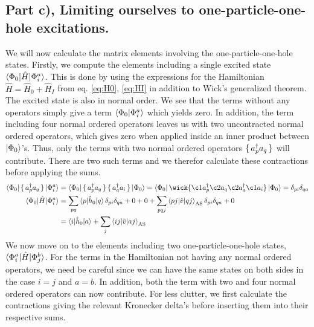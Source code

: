 \documentclass{article}
\newcommand{\gs}{\ket{\Phi_0}}
\newcommand{\inner}[3]{\braket{#1|#2|#3}}
\newcommand{\innerAS}[3]{\inner{#1}{#2}{#3}_{\text{AS}}}
\newcommand{\hnull}{\hat{h}_0}
\newcommand{\crt}[1]{a_{#1}^{\dagger}}
\newcommand{\ani}[1]{a_{#1}}
\begin{document}
\subsection*{Part c), Limiting ourselves to one-particle-one-hole excitations.}
    We will now calculate the matrix elements involving the one-particle-one-hole states. Firstly, we compute the elements including a single excited state $\inner{\Phi_0}{\hat{H}}{\Phi_i^a}$. This is done by using the expressions for the Hamiltonian $\hat{H} = \hat{H}_0 + \hat{H}_I$ from eq. \ref{eq:H0}, \ref{eq:HI} in addition to Wick's generalized theorem. The excited state is also in normal order. We see that the terms without any operators simply give a term $\braket{\Phi_0 | \Phi_{i}^{a}}$ which yields zero. In addition, the term including four normal ordered operators leaves us with two uncontracted normal ordered operators, which gives zero when applied inside an inner product between  $\gs$'s. Thus, only the terms with two normal ordered operators $\set{\crt{p}\ani{q}}$ will contribute. There are two such terms and we therefor calculate these contractions before applying the sums.  
    \begin{align}
        \inner{\Phi_0}{\set{\crt{p}\ani{q}}}{\Phi_{i}^{a}} &= \inner{\Phi_0}{\set{\crt{p}\ani{q}} \set{\crt{a}\ani{i}}}{\Phi_0} = \bra{\Phi_0} \wick{\c1{a}^\dagger_p \c2{a}_q \c2{a}^\dagger_a \c1{\ani{i}}} \ket{\Phi_0} = \delta_{pi}\delta_{qa} \nonumber\\
        \inner{\Phi_0}{\hat{H}}{\Phi_i^a} &= \sum_{pq} \inner{p}{\hnull}{q}\delta_{pi}\delta_{qa} + 0 + 0 + \sum_{pqj} \innerAS{pj}{\hat{v}}{qj}\delta_{pi}\delta_{qa} + 0 \nonumber\\
        &= \inner{i}{\hnull}{a} + \sum_j \innerAS{ij}{\hat{v}}{aj} \label{eq:phi0_phi_ia}
    \end{align}
    We now move on to the elements including two one-particle-one-hole states, $\inner{\Phi_i^a}{\hat{H}}{\Phi_j^b}$. For the terms in the Hamiltonian not having any normal ordered operators, we need be careful since we can have the same states on both sides in the case $i=j$ and $a=b$. In addition, both the term with two and four normal ordered operators can now contribute. For less clutter, we first calculate the contractions giving the relevant Kronecker delta's before inserting them into their respective sums. 
\end{document}
